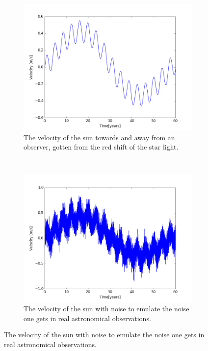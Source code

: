 \documentclass[a4paper, 10pt]{article}
\begin{document}
\begin{figure}[H]
\centering
\begin{subfigure}[t]{0.5\textwidth}
\centering
\includegraphics[width=\textwidth]{part2sunNoNoise.png}
\caption{The velocity of the sun towards and away from an observer, gotten from the red shift of the star light.}
\end{subfigure}%
~
\begin{subfigure}[t]{0.5\textwidth}
\centering
\includegraphics[width=\textwidth]{part2sunNoise.png}
\caption{The velocity of the sun with noise to emulate the noise one gets in real astronomical observations.}
\end{subfigure}%
\end{figure}
\end{document}
